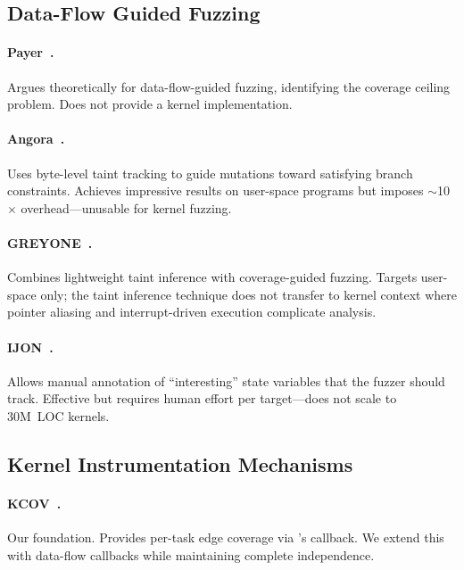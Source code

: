\documentclass{ndss}
\begin{document}
\subsection{Data-Flow Guided Fuzzing}

\paragraph{Payer~\cite{payer2019dataflow}.} Argues theoretically for
data-flow-guided fuzzing, identifying the coverage ceiling problem. Does not
provide a kernel implementation.

\paragraph{Angora~\cite{chen2018angora}.} Uses byte-level taint tracking to
guide mutations toward satisfying branch constraints. Achieves impressive
results on user-space programs but imposes $\sim$10$\times$ overhead---unusable
for kernel fuzzing.

\paragraph{GREYONE~\cite{gan2020greyone}.} Combines lightweight taint inference
with coverage-guided fuzzing. Targets user-space only; the taint inference
technique does not transfer to kernel context where pointer aliasing and
interrupt-driven execution complicate analysis.

\paragraph{IJON~\cite{aschermann2020ijon}.} Allows manual annotation of
``interesting'' state variables that the fuzzer should track. Effective but
requires human effort per target---does not scale to 30M~LOC kernels.

\subsection{Kernel Instrumentation Mechanisms}

\paragraph{KCOV~\cite{vyukov2016kcov}.} Our foundation. Provides per-task edge
coverage via \sancov's \tracepc callback. We extend this with data-flow
callbacks while maintaining complete independence.
\end{document}
